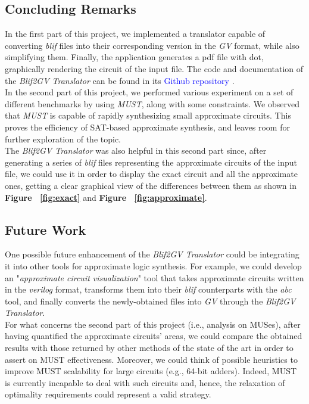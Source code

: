 \documentclass[]{usiinfbachelorproject}
\begin{document}
\subsection{Concluding Remarks}
In the first part of this project, we implemented a translator capable of converting \textit{blif} files into their corresponding version in the \textit{GV} format, while also simplifying them. Finally, the application generates a pdf file with dot, graphically rendering the circuit of the input file. The code and documentation of the \textit{Blif2GV Translator} can be found in its \textcolor{blue}{Github repository} \cite{gh}. \\
In the second part of this project, we performed various experiment on a set of different benchmarks by using \textit{MUST}, along with some constraints. We observed that \textit{MUST} is capable of rapidly synthesizing small approximate circuits. This proves the efficiency of SAT-based approximate synthesis, and leaves room for further exploration of the topic. \\
The \textit{Blif2GV Translator} was also helpful in this second part since, after generating a series of \textit{blif} files representing the approximate circuits of the input file, we could use it in order to display the exact circuit and all the approximate ones, getting a clear graphical view of the differences between them as shown in \textbf{Figure ~\ref{fig:exact}} and \textbf{Figure ~\ref{fig:approximate}}.
\subsection{Future Work}
One possible future enhancement of the \textit{Blif2GV Translator} could be integrating it into other tools for approximate logic synthesis. For example, we could develop an "\textit{approximate circuit visualization}" tool that takes approximate circuits written in the \textit{verilog} format, transforms them into their \textit{blif} counterparts with the \textit{abc} tool, and finally converts the newly-obtained files into \textit{GV} through the \textit{Blif2GV Translator}. \\
For what concerns the second part of this project (i.e., analysis on MUSes), after having quantified the approximate circuits' areas, we could compare the obtained results with those returned by other methods of the state of the art in order to assert on MUST effectiveness. Moreover, we could think of possible heuristics to improve MUST scalability for large circuits (e.g., 64-bit adders). Indeed, MUST is currently incapable to deal with such circuits and, hence, the relaxation of optimality requirements could represent a valid strategy.
\end{document}
